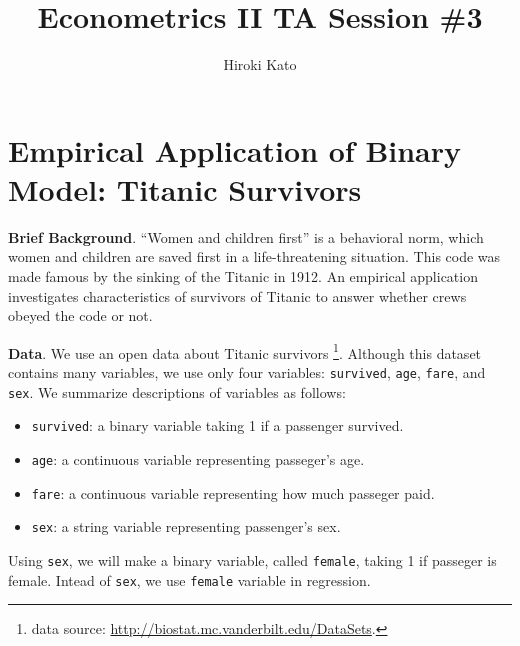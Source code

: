 \documentclass[
  12pt,
]{article}
\title{Econometrics II TA Session \#3}
\author{Hiroki Kato}
\date{}
\providecommand{\tightlist}{%
  \setlength{\itemsep}{0pt}\setlength{\parskip}{0pt}}
\begin{document}
\maketitle

\hypertarget{empirical-application-of-binary-model-titanic-survivors}{%
\section{Empirical Application of Binary Model: Titanic
Survivors}\label{empirical-application-of-binary-model-titanic-survivors}}

\textbf{Brief Background}. ``Women and children first'' is a behavioral
norm, which women and children are saved first in a life-threatening
situation. This code was made famous by the sinking of the Titanic in
1912. An empirical application investigates characteristics of survivors
of Titanic to answer whether crews obeyed the code or not.

\noindent \textbf{Data}. We use an open data about Titanic survivors
\footnote{data source: \url{http://biostat.mc.vanderbilt.edu/DataSets}.}.
Although this dataset contains many variables, we use only four
variables: \texttt{survived}, \texttt{age}, \texttt{fare}, and
\texttt{sex}. We summarize descriptions of variables as follows:

\begin{itemize}
\tightlist
\item
  \texttt{survived}: a binary variable taking 1 if a passenger survived.
\item
  \texttt{age}: a continuous variable representing passeger's age.
\item
  \texttt{fare}: a continuous variable representing how much passeger
  paid.
\item
  \texttt{sex}: a string variable representing passenger's sex.
\end{itemize}

Using \texttt{sex}, we will make a binary variable, called
\texttt{female}, taking 1 if passeger is female. Intead of \texttt{sex},
we use \texttt{female} variable in regression.
\end{document}
